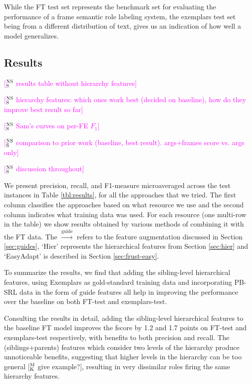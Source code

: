 \documentclass[11pt,a4paper]{article}
\newcommand{\ensuretext}[1]{#1}
\newcommand{\nssmarker}{\ensuretext{\textcolor{magenta}{\ensuremath{^{\textsc{NS}}_{\textsc{S}}}}}}
\newcommand{\mkmarker}{\ensuretext{\textcolor{mdgreen}{\ensuremath{^{\textsc{M}}_{\textsc{K}}}}}}
\newcommand{\arkcomment}[3]{\ensuretext{\textcolor{#3}{[#1 #2]}}}
\newcommand{\nss}[1]{\arkcomment{\nssmarker}{#1}{magenta}}
\newcommand{\mk}[1]{\arkcomment{\mkmarker}{#1}{mdgreen}}
\begin{document}
While the FT test set represents the benchmark set for evaluating the 
performance of a frame semantic role labeling system, the exemplars test set being from a different distribution of text, gives us
an indication of how well a model generalizes.

\subsection{Results}

\nss{results table without hierarchy features}

\nss{hierarchy features: which ones work best (decided on baseline), how do they improve best result so far}

\nss{Sam's curves on per-FE $F_1$}

\nss{comparison to prior work (baseline, best result). args+frames score vs. args only}

\nss{discussion throughout}

We present precision, recall, and F1-measure microaveraged across the test instances in Table \ref{tbl:results}, for all the approaches that we tried.
The first column classifies the approaches based on what resource we use and the second column indicates what training data was used. 
For each resource (one multi-row in the table) we show results obtained by various methods of combining it with the FT data.
The $\xrightarrow{\text{guide}}$ refers to the feature augmentation discussed in Section \ref{sec:guides},
`Hier' represents the hierarchical features from Section \ref{sec:hier} and `EasyAdapt' is described in Section \ref{sec:frust-easy}.

To summarize the results, we find that adding the sibling-level hierarchical features, using Exemplars as gold-standard training data and 
incorporating PB-SRL data in the form of guide features all help in improving the performance over the baseline on both FT-test and exemplars-test.



Consulting the results in detail, adding the sibling-level hierarchical features to the baseline FT model improves 
the fscore by 1.2 and 1.7 points on FT-test and exemplars-test respectively,
with benefits to both precision and recall. The (siblings+parents) features which consider two levels of the hierarchy produce unnoticeable benefits,
suggesting that higher levels in the hierarchy can be too general \mk{give example?}, resulting in very dissimilar roles firing the same hierarchy features.
\end{document}
